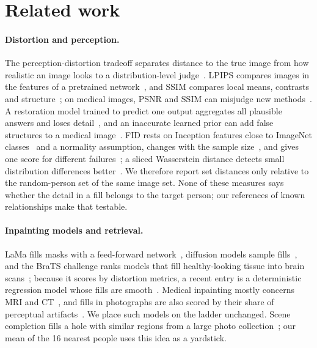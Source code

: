 \section{Related work}
\label{sec:related}
\paragraph{Distortion and perception.}
The perception-distortion tradeoff separates distance to the true image from how realistic an image looks to a distribution-level judge~\cite{blau2018,freirich2021dp}.
\ac{LPIPS} compares images in the features of a pretrained network~\cite{zhang2018lpips}, and \ac{SSIM} compares local means, contrasts and structure~\cite{wang2004}; on medical images, \ac{PSNR} and \ac{SSIM} can misjudge new methods~\cite{breger2025fr}.
A restoration model trained to predict one output aggregates all plausible answers and loses detail~\cite{delbracio2023indi,ohayon2025pmrf}, and an inaccurate learned prior can add false structures to a medical image~\cite{bhadra2021}.
\ac{FID} rests on Inception features close to ImageNet classes~\cite{kynkaanniemi2023fid} and a normality assumption, changes with the sample size~\cite{cmmd2024}, and gives one score for different failures~\cite{sajjadi2018pr}; a sliced Wasserstein distance detects small distribution differences better~\cite{kwon2026swd}. We therefore report set distances only relative to the random-person set of the same image set.
None of these measures says whether the detail in a fill belongs to the target person; our references of known relationships make that testable.

\paragraph{Inpainting models and retrieval.}
LaMa fills masks with a feed-forward network~\cite{lama2022}, diffusion models sample fills~\cite{lugmayr2022repaint,rombach2022ldm}, and the \ac{BraTS} challenge ranks models that fill healthy-looking tissue into brain scans~\cite{brats2023}; because it scores by distortion metrics, a recent entry is a deterministic regression model whose fills are smooth~\cite{danese2026udit}. Medical inpainting mostly concerns \ac{MRI} and \ac{CT}~\cite{santos2025review}, and fills in photographs are also scored by their share of perceptual artifacts~\cite{zhang2022par}. We place such models on the ladder unchanged.
Scene completion fills a hole with similar regions from a large photo collection~\cite{hays2007scene}; our mean of the 16 nearest people uses this idea as a yardstick.

